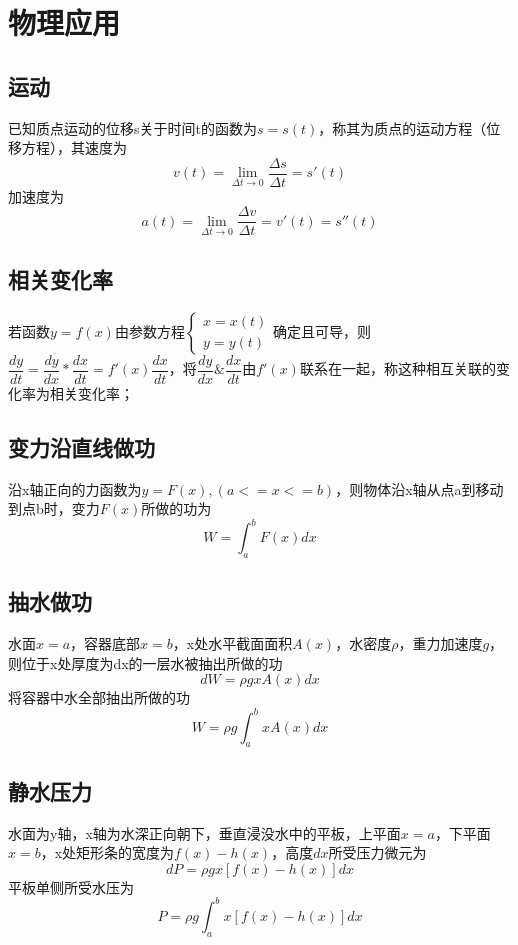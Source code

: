 
\chapter{物理应用}

\section{运动}
已知质点运动的位移s关于时间t的函数为\(s = s(t)\)，称其为质点的运动方程（位移方程），其速度为\[v(t) = \lim_{\Delta t \to 0}\dfrac{\Delta s}{\Delta t} = s'(t)\]
加速度为\[a(t) = \lim_{\Delta t \to 0}\dfrac{\Delta v}{\Delta t} = v'(t) = s''(t)\]

\section{相关变化率}
若函数\(y = f(x)\)由参数方程\(\begin{cases}
    x = x(t) \\ 
    y = y(t)
\end{cases}\)确定且可导，则\(\dfrac{dy}{dt} = \dfrac{dy}{dx} * \dfrac{dx}{dt} = f'(x)\dfrac{dx}{dt}\)，将\(\dfrac{dy}{dx} \&\dfrac{dx}{dt}\)由\(f'(x)\)联系在一起，称这种相互关联的变化率为相关变化率；


\section{变力沿直线做功}
沿x轴正向的力函数为\(y = F(x), (a <= x <= b)\)，则物体沿x轴从点a到移动到点b时，变力\(F(x)\)所做的功为\[W = \int_a^bF(x)dx\]


\section{抽水做功}
水面\(x = a\)，容器底部\(x = b\)，x处水平截面面积\(A(x)\)，水密度\(\rho\)，重力加速度\(g\)，则位于x处厚度为dx的一层水被抽出所做的功\[dW = \rho gxA(x)dx\]
将容器中水全部抽出所做的功\[W = \rho g\int_a^bxA(x)dx\]


\section{静水压力}
水面为y轴，x轴为水深正向朝下，垂直浸没水中的平板，上平面\(x = a\)，下平面\(x = b\)，x处矩形条的宽度为\(f(x) - h(x)\)，高度\(dx\)所受压力微元为\[dP = \rho gx[f(x) - h(x)]dx\]
平板单侧所受水压为\[P = \rho g\int_a^bx[f(x) - h(x)]dx\]


